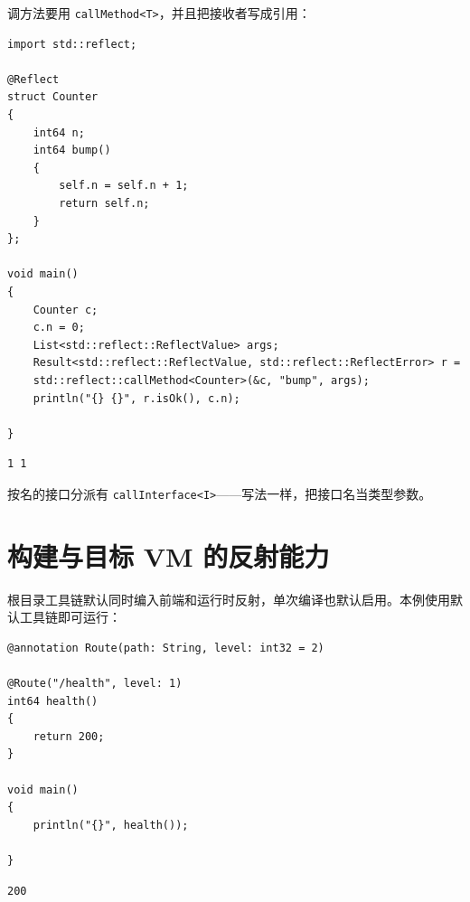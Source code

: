 调方法要用 \texttt{call\allowbreak{}Method<\allowbreak{}T>\allowbreak{}}，并且把接收者写成引用：

\par
\medskip
\begin{lstlisting}[style=chali]
import std::reflect;

@Reflect
struct Counter
{
    int64 n;
    int64 bump()
    {
        self.n = self.n + 1;
        return self.n;
    }
};

void main()
{
    Counter c;
    c.n = 0;
    List<std::reflect::ReflectValue> args;
    Result<std::reflect::ReflectValue, std::reflect::ReflectError> r =
    std::reflect::callMethod<Counter>(&c, "bump", args);
    println("{} {}", r.isOk(), c.n);

}
\end{lstlisting}
\par
\medskip

\par
\medskip
\begin{lstlisting}[style=out]
1 1
\end{lstlisting}
\par
\medskip

按名的接口分派有 \texttt{call\allowbreak{}Interface<\allowbreak{}I>\allowbreak{}}——写法一样，把接口名当类型参数。

\section{构建与目标 VM 的反射能力}

根目录工具链默认同时编入前端和运行时反射，单次编译也默认启用。本例使用默认工具链即可运行：

\par
\medskip
\begin{lstlisting}[style=chali]
@annotation Route(path: String, level: int32 = 2)

@Route("/health", level: 1)
int64 health()
{
    return 200;
}

void main()
{
    println("{}", health());

}
\end{lstlisting}
\par
\medskip

\par
\medskip
\begin{lstlisting}[style=out]
200
\end{lstlisting}
\par
\medskip

